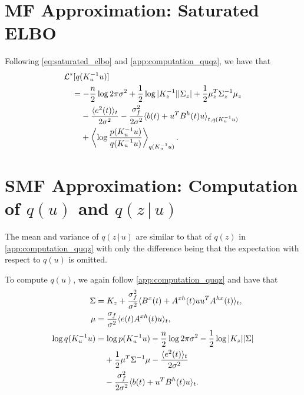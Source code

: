 \documentclass{article}
\newcommand{\id}[1]{\, \mathrm{d} #1}     %
\newcommand{\cond}{\, | \,}               %
\renewcommand{\ll}{\left}
\newcommand{\rr}{\right}
\newcommand{\la}{\langle}
\newcommand{\ra}{\rangle}
\newcommand{\phan}[1]{\hphantom{#1\;}}
\begin{document}
\section{MF Approximation: Saturated ELBO}
\label{app:saturated_elbo}
Following \cref{eq:saturated_elbo} and \cref{app:computation_quqz}, we have that
\begin{align*}
    &\mathcal{L}^*[q(K_u^{-1} u)] \\
    &\quad = - \frac{n}{2}\log 2 \pi \sigma^2 + \frac{1}{2}\log|K_z^{-1}||\Sigma_z| + \frac{1}{2}\mu_z^T \Sigma_z^{-1}\mu_z  \\
    &\quad \phan{=} - \frac{\la e^2(t)\ra_t}{2 \sigma^2}- \frac{\sigma_f^2}{2 \sigma^2}\la b(t) +  u^T B^{h}(t) u \ra_{t,q(K_u^{-1}u)} \\
    &\quad \phan{=}  + \ll\la \log \frac{p(K_u^{-1}u)}{q(K_u^{-1}u)} \rr\ra_{q(K_u^{-1}u)}.
\end{align*}

\section{SMF Approximation: Computation of $q(u)$ and $q(z\cond u)$}
\label{app:computation_quz}
The mean and variance of $q(z\cond u)$ are similar to that of $q(z)$ in \cref{app:computation_quqz} with only the difference being that the expectation with respect to $q(u)$ is omitted.

To compute $q(u)$, we again follow \cref{app:computation_quqz} and have that
\begin{align*}
    \Sigma &= K_z + \frac{\sigma_f^2}{\sigma^2} \la B^x(t) + A^{xh}(t) u u^TA^{hx}(t) \ra_t, \\
    \mu &= \frac{\sigma_f}{\sigma^2}\la e(t) A^{xh}(t)u\ra_{t}, \\
    \log q(K_u^{-1} u) &= \log p(K_u^{-1} u)- \frac{n}{2}\log 2 \pi \sigma^2 -\frac{1}{2}\log|K_z||\Sigma|\\
    &\phan{=}+ \frac{1}{2}\mu^T \Sigma^{-1} \mu- \frac{\la e^2(t)\ra_t}{2 \sigma^2} \\
    &\phan{=}  - \frac{\sigma_f^2}{2 \sigma^2} \la b(t) + u^T B^h(t)u \ra_t.
\end{align*}







\end{document}
